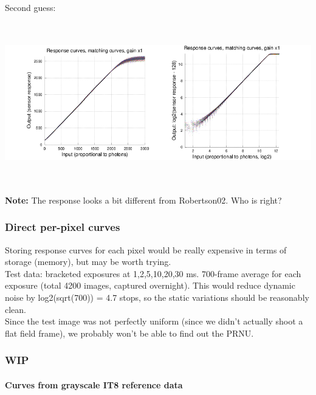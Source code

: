 Second guess:\\

\begin{center}
\includegraphics[height=7cm]{images/response-curve-test}
\end{center}

\textbf{Note:} The response looks a bit different from Robertson02. Who is right?\\




\subsubsection{Direct per-pixel curves}

Storing response curves for each pixel would be really expensive in terms of storage (memory), but may be worth trying.\\

Test data: bracketed exposures at 1,2,5,10,20,30 ms. 700-frame average for each exposure (total 4200 images, captured overnight). This would reduce dynamic noise by log2(sqrt(700)) = 4.7 stops, so the static variations should be reasonably clean.\\

Since the test image was not perfectly uniform (since we didn't actually shoot a flat field frame), we probably won't be able to find out the PRNU. \\



\subsubsection{WIP}

\paragraph{Curves from grayscale IT8 reference data}\mbox{}\\

